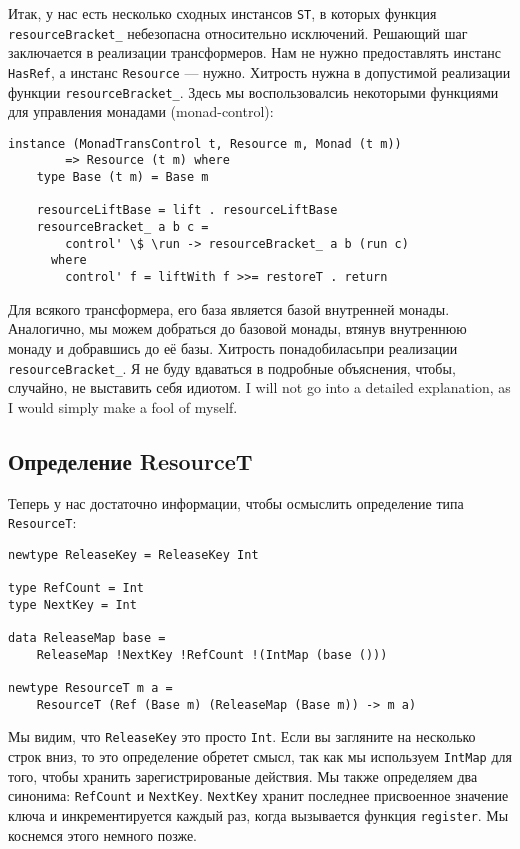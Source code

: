 Итак, у нас есть несколько сходных инстансов \lstinline'ST', в которых функция
\lstinline'resourceBracket_' небезопасна относительно исключений. Решающий шаг заключается
в реализации трансформеров. Нам не нужно
предоставлять инстанс \lstinline'HasRef', а инстанс \lstinline'Resource' --- нужно.
Хитрость нужна в допустимой реализации функции \lstinline'resourceBracket_'. Здесь мы
воспользовалсиь некоторыми функциями для управления монадами (monad-control):

\begin{lstlisting}
instance (MonadTransControl t, Resource m, Monad (t m))
        => Resource (t m) where
    type Base (t m) = Base m

    resourceLiftBase = lift . resourceLiftBase
    resourceBracket_ a b c =
        control' \$ \run -> resourceBracket_ a b (run c)
      where
        control' f = liftWith f >>= restoreT . return 
\end{lstlisting}
Для всякого трансформера, его база является базой внутренней монады. Аналогично, мы можем
добраться до базовой монады, втянув внутреннюю монаду и добравшись до её базы. Хитрость
понадобиласьпри реализации \verb=resourceBracket_=. Я не буду вдаваться в подробные
объяснения, чтобы, случайно, не выставить себя идиотом.
I will not go into a detailed explanation, as I would simply make a fool of myself.

\subsection{Определение ResourceT}

Теперь у нас достаточно информации, чтобы осмыслить определение типа
\lstinline'ResourceT':
\begin{lstlisting}
newtype ReleaseKey = ReleaseKey Int

type RefCount = Int
type NextKey = Int

data ReleaseMap base =
    ReleaseMap !NextKey !RefCount !(IntMap (base ()))

newtype ResourceT m a =
    ResourceT (Ref (Base m) (ReleaseMap (Base m)) -> m a)
\end{lstlisting}
Мы видим, что \lstinline'ReleaseKey' это просто \lstinline'Int'. Если вы загляните на
несколько строк вниз, то
это определение обретет смысл, так как мы используем \lstinline'IntMap' для того, чтобы
хранить
зарегистрированые действия. Мы также определяем два синонима: \lstinline'RefCount' и
\lstinline'NextKey'. \lstinline'NextKey'
хранит последнее присвоенное значение ключа и инкрементируется каждый раз, когда
вызывается функция \verb=register=. Мы коснемся этого немного позже.

